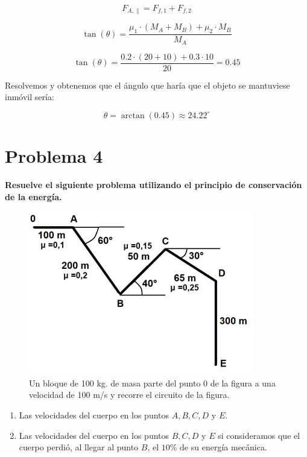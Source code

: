 \documentclass[a4paper,12pt]{article} %
\begin{document}
\[
F_{A,\parallel} = F_{f,1} + F_{f,2}
\]

\[
\tan(\theta) = \frac{\mu_1 \cdot (M_A + M_B) + \mu_2 \cdot M_B}{M_A}
\]

\[
\tan(\theta) = \frac{0.2 \cdot (20 + 10) + 0.3 \cdot 10}{20} = 0.45
\]

Resolvemos y obtenemos que el ángulo que haría que el objeto se mantuviese inmóvil sería:

\[
\theta = \arctan(0.45) \approx 24.22^\circ
\]


\section*{Problema 4}

\begin{justify}
    \textbf{Resuelve el siguiente problema utilizando el principio de conservación de la energía.}
\end{justify}
\begin{figure}[h!]
    \centering
    \includegraphics[width=\textwidth]{problema 4.png}
    \caption{Un bloque de 100 kg. de masa parte del punto 0 de la figura a una velocidad de 100 m/s y recorre el circuito de la figura.}
\end{figure}

\begin{enumerate}
    \item Las velocidades del cuerpo en los puntos \(A, B, C, D\) y \(E\).
    \item Las velocidades del cuerpo en los puntos \(B, C, D\) y \(E\) si consideramos que el cuerpo perdió, al llegar al punto \(B\), el \(10\%\) de su energía mecánica.
\end{enumerate}
\end{document}
